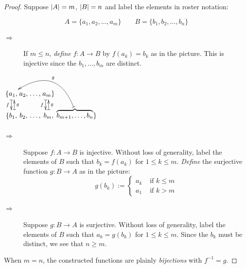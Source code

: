 \begin{proof}
Suppose $\left| A\right|=m$, $\left| B\right|=n$ and label the elements in roster notation:\par
\begin{minipage}[t]{0.63\linewidth}\vspace{-14pt}
\[
	A=\{a_1,a_2,\ldots,a_m\}\qquad B=\{b_1,b_2,\ldots,b_n\}
\]
\begin{description}
	\item[\normalfont {} $\Rightarrow$ ]
	If $m\le n$, \emph{define} $f:A\to B$ by $f(a_k)=b_k$ as in the picture. This is injective since the $b_1,\ldots,b_m$ are distinct.
\end{description}
\end{minipage}
\hfill
\begin{minipage}[t]{0.3\linewidth}\vspace{-20pt}
	\flushright
	$\xymatrix @C0pt @R10pt @M1.4pt @H15pt{
		\{a_1, \ar@{|->}[d]_f &a_2,&\ldots,&a_m\} \ar@<-1ex>@{|->}[d]_f\\
		\{b_1, \ar@<-1ex>@{|->}[u]_g &b_2,&\ldots,&b_m, \ar@<0ex>@{|->}[u]_g&\overbrace{b_{m+1},\ldots,b_n}\} \ar@(u,ur)@{|->}@/_3pc/[ullll]_g
	}$
\end{minipage}
\vspace{-2pt}
\begin{description}%
	\item[\normalfont {} $\Rightarrow$ ] Suppose $f:A\to B$ is injective. Without loss of generality, label the elements of $B$ such that $b_k=f(a_k)$ for $1\le k\le m$. \emph{Define} the surjective function $g:B\to A$ as in the picture:\footnotemark{}%
  \[
  	g(b_k):=
  	\begin{cases}
  		a_k&\text{ if }k\le m\\
  		a_1&\text{ if }k>m
  	\end{cases}
  \]
  \item[\normalfont {} $\Rightarrow$ ] Suppose $g:B\to A$ is surjective. Without loss of generality, label the elements of $B$ such that $a_k=g(b_k)$ for $1\le k\le m$. Since the $b_k$ must be distinct, we see that $n\ge m$.
\end{description}
When $m=n$, the constructed functions are plainly \emph{bijections} with $f^{-1}=g$.
\end{proof}

\vspace{-5pt}


